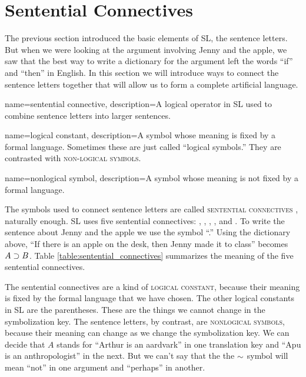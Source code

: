 \section{Sentential Connectives}


The previous section introduced the basic elements of SL, the sentence letters. But when we were looking at the argument involving Jenny and the apple, we saw that the best way to write a dictionary for the argument left the words ``if'' and ``then'' in English. In this section we will introduce ways to connect the sentence letters together that will allow us to form a complete artificial language.   

{
name=sentential connective,
description={A logical operator in SL used to combine sentence letters into larger sentences.}
}

{
name=logical constant,
description={A symbol whose meaning is fixed by a formal language. Sometimes these are just called ``logical symbols.'' They are contrasted with \textsc{non-logical symbols}.}
}

{
name=nonlogical symbol,
description={A symbol whose meaning is not fixed by a formal language.}
}

The symbols used to connect sentence letters are called \textsc{\glspl{sentential connective}} \label{def:sentential_connective}, naturally enough. SL uses five sentential connectives: \eand, \eor, \enot, \eif, and \eiff. To write the sentence about Jenny and the apple we use the symbol ``\eif.'' Using the dictionary above, ``If there is an apple on the desk, then Jenny made it to class'' becomes $A \supset B$. Table \ref{table:sentential_connectives} summarizes the meaning of the five sentential connectives.

The sentential connectives are a kind of \textsc{\gls{logical constant}},\label{def:logical_constant} because their meaning is fixed by the formal language that we have chosen. The other logical constants in SL are the parentheses. These are the things we cannot change in the symbolization key. The sentence letters, by contrast, are \textsc{\glspl{nonlogical symbol}}, \label{def:nonlogical_symbol} because their meaning can change as we change the symbolization key. We can decide that $A$ stands for ``Arthur is an aardvark'' in one translation key and ``Apu is an anthropologist'' in the next. But we can't say that the  the $\mathord{\sim}$ symbol will mean ``not'' in one argument and ``perhaps'' in another.

